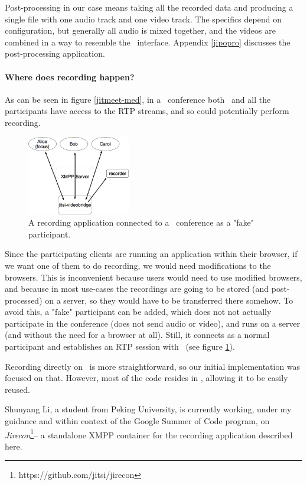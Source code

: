 \documentclass[twoside,openright,a4paper,12pt,english]{article}
\begin{document}
Post-processing in our case means taking all the recorded data and producing a
single file with one audio track and one video track. The specifics depend on
configuration, but
generally all audio is mixed together, and the videos are combined in a way to
resemble the \jm\ interface. Appendix \ref{jipopro} discusses the
post-processing application.


\paragraph*{Where does recording happen?}
As can be seen in figure \ref{jitmeet-med}, in a \jm\ conference both \jvb\ and
all the participants have access to the RTP streams, and so could potentially
perform recording.

\begin{figure}
   \centering
        \includegraphics[width=0.4\textwidth]{./pics/jm-rec.eps}
        \caption{A recording application connected to a \jm\ conference as a "fake" participant.}
   \label{jitmeet-rec}
\end{figure}

Since the participating clients are running an application within their
browser, if we want one of them to do recording, we would need modifications to
the browsers. This is inconvenient because users would need to use modified
browsers, and because in most use-cases the recordings are going to be stored
(and post-processed) on a server, so they would have to be transferred there
somehow.  To avoid this, a "fake" participant can
be added, which does not not actually participate in the conference
(does not send audio or video), and runs on a server (and without the need for a browser at all). Still, it
connects as a normal participant and establishes an RTP session with \jvb\ (see
figure \ref{jitmeet-rec}).


Recording directly on \jvb\ is more straightforward, so our initial
implementation was focused on that. However, most of the code resides in \lj, allowing
it to be easily reused.

Shunyang Li, a student from Peking University, is currently working, under my
guidance and within context of the Google Summer of Code program, on
\emph{Jirecon}\footnote{https://github.com/jitsi/jirecon}-- a standalone XMPP
container for the recording application described here.
\end{document}
